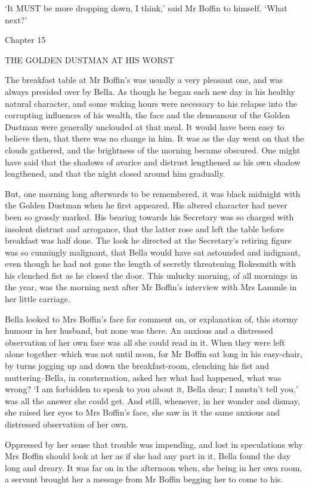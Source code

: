 ‘It MUST be more dropping down, I think,’ said Mr Boffin to himself.
‘What next?’



Chapter 15

THE GOLDEN DUSTMAN AT HIS WORST


The breakfast table at Mr Boffin’s was usually a very pleasant one, and
was always presided over by Bella. As though he began each new day in
his healthy natural character, and some waking hours were necessary to
his relapse into the corrupting influences of his wealth, the face and
the demeanour of the Golden Dustman were generally unclouded at that
meal. It would have been easy to believe then, that there was no change
in him. It was as the day went on that the clouds gathered, and the
brightness of the morning became obscured. One might have said that the
shadows of avarice and distrust lengthened as his own shadow lengthened,
and that the night closed around him gradually.

But, one morning long afterwards to be remembered, it was black midnight
with the Golden Dustman when he first appeared. His altered character
had never been so grossly marked. His bearing towards his Secretary was
so charged with insolent distrust and arrogance, that the latter rose
and left the table before breakfast was half done. The look he directed
at the Secretary’s retiring figure was so cunningly malignant, that
Bella would have sat astounded and indignant, even though he had not
gone the length of secretly threatening Rokesmith with his clenched
fist as he closed the door. This unlucky morning, of all mornings in the
year, was the morning next after Mr Boffin’s interview with Mrs Lammle
in her little carriage.

Bella looked to Mrs Boffin’s face for comment on, or explanation of,
this stormy humour in her husband, but none was there. An anxious and
a distressed observation of her own face was all she could read in it.
When they were left alone together--which was not until noon, for Mr
Boffin sat long in his easy-chair, by turns jogging up and down
the breakfast-room, clenching his fist and muttering--Bella, in
consternation, asked her what had happened, what was wrong? ‘I am
forbidden to speak to you about it, Bella dear; I mustn’t tell you,’
was all the answer she could get. And still, whenever, in her wonder and
dismay, she raised her eyes to Mrs Boffin’s face, she saw in it the same
anxious and distressed observation of her own.

Oppressed by her sense that trouble was impending, and lost in
speculations why Mrs Boffin should look at her as if she had any part in
it, Bella found the day long and dreary. It was far on in the afternoon
when, she being in her own room, a servant brought her a message from Mr
Boffin begging her to come to his.

